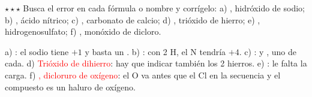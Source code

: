 \begin{exercise}
    \(\star\star\star\) Busca el error en cada fórmula o nombre y corrígelo: a) , hidróxido de sodio; b) ,
    ácido nítrico; c) , carbonato de calcio; d) , trióxido de hierro; e) , hidrogenosulfato; f)
    , monóxido de dicloro.
    \begin{solu}
        a) \textcolor{red}{}: el sodio tiene \(+1\) y basta un . b) \textcolor{red}{}: con 2 H, el N
        tendría \(+4\). c) \textcolor{red}{}:  y , uno de cada. d) \textcolor{red}{Trióxido de
        dihierro}: hay que indicar también los 2 hierros. e) \textcolor{red}{}: le falta la carga. f)
        \textcolor{red}{, dicloruro de oxígeno}: el O va antes que el Cl en la secuencia y el compuesto es un haluro de
        oxígeno.
    \end{solu}
\end{exercise}

\fussy
